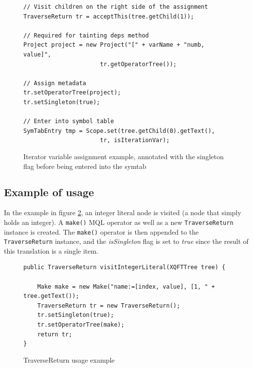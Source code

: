 \begin{figure}[!htp]
\begin{center}
\begin{Verbatim}
// Visit children on the right side of the assignment
TraverseReturn tr = acceptThis(tree.getChild(1));

// Required for tainting deps method
Project project = new Project("[" + varName + "numb, value]", 
                      tr.getOperatorTree());

// Assign metadata
tr.setOperatorTree(project);
tr.setSingleton(true);

// Enter into symbol table
SymTabEntry tmp = Scope.set(tree.getChild(0).getText(), 
                      tr, isIterationVar);
\end{Verbatim}
  \caption{Iterator variable assignment example, annotated with the singleton flag
  before being entered into the symtab}
  \label{fig:impl:meta:var_assign_ex}
\end{center}
\end{figure}

\subsection{Example of usage}
In the example in figure \ref{fig:impl:meta:traverse_usage_ex}, an
integer literal node is visited (a node that simply holds an integer). A
\texttt{make()} MQL operator as well as a new \texttt{TraverseReturn}
instance is created. The \texttt{make()} operator is then appended to the 
\texttt{TraverseReturn} instance, and the \textit{isSingleton} flag is set to 
\textit{true} since the result of this translation is a single item.

\begin{figure}[!htp]
\begin{center}
\begin{Verbatim}
public TraverseReturn visitIntegerLiteral(XQFTTree tree) {

    Make make = new Make("name:=[index, value], [1, " + tree.getText());
    TraverseReturn tr = new TraverseReturn();        
    tr.setSingleton(true);
    tr.setOperatorTree(make);
    return tr;
}
\end{Verbatim}
  \caption{TraverseReturn usage example}
  \label{fig:impl:meta:traverse_usage_ex}
\end{center}
\end{figure}